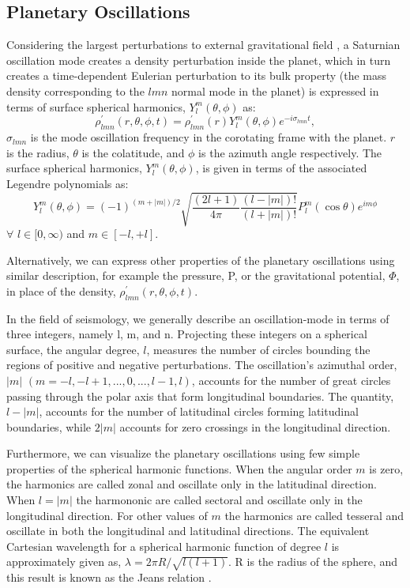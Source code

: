 \documentclass[conference]{IEEEtran}
\begin{document}
\subsection{Planetary Oscillations}\label{AA}
Considering the largest perturbations to external gravitational field \cite{article} \cite{Marley1993PlanetaryAM}\cite{Mankovich_2019}, a Saturnian oscillation mode creates a density perturbation inside the planet, which in turn creates a time-dependent Eulerian perturbation to its bulk property (the mass density corresponding
to the $lmn$ normal mode in the planet) is expressed in terms of surface spherical harmonics, $Y_{l}^{m}(\theta,\phi)$ as: 
\begin{equation}
    \rho_{lmn}^{'}(r,\theta,\phi,t) =   \rho_{lmn}^{'}(r)Y_{l}^{m}(\theta,\phi)e^{-i\sigma_{lmn}t},
\end{equation}
$\sigma_{lmn}$ is the mode oscillation frequency in the corotating frame with the planet. $r$ is the radius, $\theta$ is the colatitude, and $\phi$ is the azimuth angle respectively. The surface spherical harmonics, $Y_{l}^{m}(\theta,\phi)$, is given in terms of the associated Legendre polynomials as: 
\begin{equation}
     Y_{l}^{m}(\theta,\phi) = (-1)^{(m+|m|)/2} \sqrt{\frac{(2l+1)}{4\pi}\frac{(l-|m|)!}{(l+|m|)!}}P^{m}_{l} (\cos\theta)e^{im\phi}
\end{equation}
$\forall$  $l \in [0, \infty)$ and $m \in [-l,+l]$.

Alternatively, we can express other properties of the planetary oscillations using similar description, for example the pressure, P, or the gravitational potential, $\Phi$, in place of the density, $\rho_{lmn}^{'}(r,\theta,\phi,t)$.

In the field of seismology, we generally describe an oscillation-mode in terms of three integers, namely l, m, and n. Projecting these integers on a spherical surface, the angular degree, $l$, measures the number of circles bounding the regions of positive and negative perturbations. The oscillation's azimuthal order, $|m|$ $(m = -l, -l+1, ..., 0,..., l-1, l)$, accounts for the number of great circles passing through the polar axis that form longitudinal boundaries. The quantity, $l-|m|$, accounts for the number of latitudinal circles forming latitudinal boundaries, while $2|m|$ accounts for zero crossings in the longitudinal direction. 

Furthermore, we can visualize the planetary oscillations using few simple properties of the spherical harmonic functions. When the angular order $m$ is zero, the harmonics are called zonal and oscillate only in the latitudinal direction. When $l=|m|$ the harmononic are called sectoral and oscillate only in the longitudinal direction.  For other values of $m$ the harmonics are called tesseral and oscillate in both the longitudinal and latitudinal directions. The equivalent Cartesian wavelength for a spherical harmonic function of degree $l$ is approximately given as, $\lambda = 2\pi R/\sqrt{l(l+1)}$. R is the radius of the sphere, and this result is known as the Jeans relation \cite{https://doi.org/10.1029/2018GC007529}.
\end{document}
